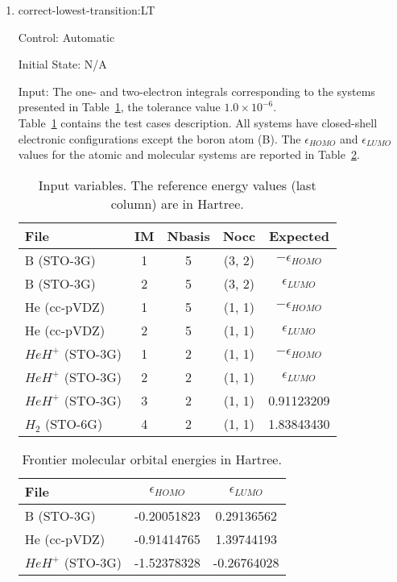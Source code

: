 \documentclass[12pt, titlepage]{article}
\begin{document}
\begin{enumerate}
	
	\item{correct-lowest-transition:LT\\}
	
	Control: Automatic
	
	Initial State: N/A
	
	Input: The one- and two-electron integrals corresponding to the systems 
	presented in Table~\ref{table:energies}, the tolerance value $1.0 \times 
	10^{-6}$.\\
	
	Table~\ref{table:energies} contains the test cases 
	description. All systems have closed-shell electronic configurations except 
	the boron atom (B). The $\epsilon_{HOMO}$ and 
	$\epsilon_{LUMO}$ values for the atomic and molecular systems are reported 
	in Table~\ref{table:koopman}.

	\begin{table}[h!]
		\centering
		\begin{tabular}{l c c c c}
			\toprule
			\textbf{File} & IM &\textbf{Nbasis} & \textbf{Nocc}& 
			\textbf{Expected}\\
			\midrule
			B (STO-3G) & 1 & 5& (3, 2)& $-\epsilon_{HOMO}$\\
			B (STO-3G) & 2 & 5& (3, 2)& $\epsilon_{LUMO}$\\
			He (cc-pVDZ)& 1& 5& (1, 1)& $-\epsilon_{HOMO}$\\
			He (cc-pVDZ)& 2& 5& (1, 1)& $\epsilon_{LUMO}$\\
			$HeH^{+}$ (STO-3G)& 1 & 2& (1, 1)& $-\epsilon_{HOMO}$\\
			$HeH^{+}$ (STO-3G)& 2 & 2& (1, 1)& $\epsilon_{LUMO}$\\
			$HeH^{+}$ (STO-3G)& 3 & 2& (1, 1)& 0.91123209\\
			$H_2$ (STO-6G)& 4 & 2& (1, 1)& 1.83843430\\			
		\end{tabular}
		\caption{Input variables. The reference energy values (last column) are 
		in Hartree.}
		\label{table:energies}
	\end{table}

	\begin{table}[h!]
		\centering
		\begin{tabular}{l c c}
			\toprule
			\textbf{File} & $\epsilon_{HOMO}$ & $\epsilon_{LUMO}$\\
			\midrule
			B (STO-3G) &-0.20051823& 0.29136562\\
			He (cc-pVDZ)& -0.91414765& 1.39744193\\
			$HeH^{+}$ (STO-3G)& -1.52378328 & -0.26764028\\		
		\end{tabular}
		\caption{Frontier molecular orbital energies in Hartree.}
		\label{table:koopman}
	\end{table}
	

\end{enumerate}
\end{document}
